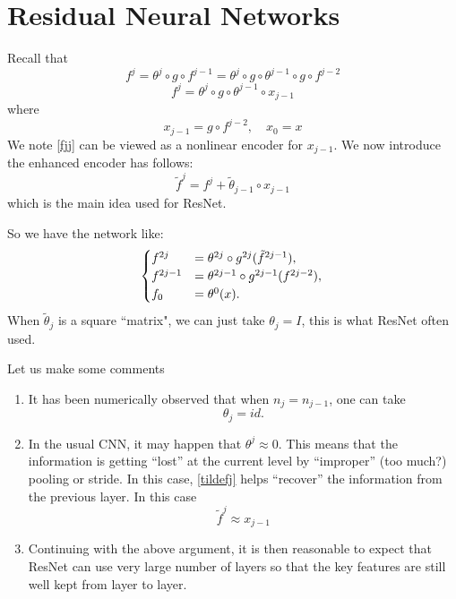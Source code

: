 \chapter{Residual Neural Networks}
Recall that 
\begin{equation}
f^j = \theta^j \circ g\circ f^{j-1}= \theta^j \circ g\circ
\theta^{j-1} \circ g \circ f^{j-2} 
\end{equation}
\begin{equation}\label{fjj}
f^j = \theta^j \circ g\circ \theta^{j-1} \circ x_{j-1}
\end{equation}
where
\begin{equation}
  \label{eq:4}
x_{j-1}=g \circ f^{j-2}, \quad x_0=x  
\end{equation}
We note \eqref{fjj} can be viewed as a nonlinear encoder for
$x_{j-1}$.  We now introduce the enhanced encoder has follows:
\begin{equation}
  \label{tildefj}
  \tilde f^j=f^{j}+\tilde \theta_{j-1}\circ x_{j-1}
\end{equation}
which is the main idea used for ResNet. 

So we have the network like:
\begin{equation}
\begin{cases}
f^{2j} &= \theta^{2j} \circ g^{2j}( \tilde f^{2j-1}), \\
f^{2j-1} &= \theta^{2j-1} \circ g^{2j-1}(f^{2j-2}), \\
f_0 &= \theta^0(x).
\end{cases} \\
\end{equation}
When $\tilde \theta_{j}$ is a square ``matrix", we can just take $ \theta_{j} = I$, this is what ResNet often used.

Let us make some comments
\begin{enumerate}
\item It has been numerically observed that when $n_j=n_{j-1}$, one can take 
  \begin{equation}
    \label{eq:1}
\theta_j=id.    
  \end{equation}
\item In the usual CNN, it may happen that $\theta^j\approx 0$.  This
  means that the information is getting ``lost'' at the current level
  by ``improper'' (too much?) pooling or stride.  In this case,
  \eqref{tildefj} helps ``recover'' the information from the previous
  layer.   In this case
  \begin{equation}
\tilde f^j\approx x_{j-1}    
  \end{equation}
\item Continuing with the above argument, it is then reasonable to
  expect that ResNet can use very large number of layers so that the
key features are still well kept from layer to layer.
\end{enumerate}

